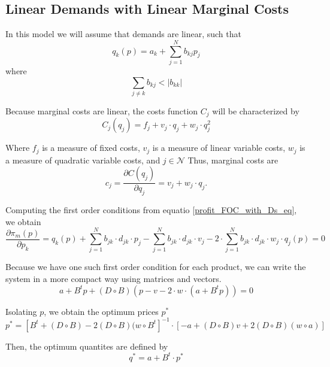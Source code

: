 \documentclass[12pt]{article}
\begin{document}
\subsection{Linear Demands with Linear Marginal Costs}

In this model we will assume that demands are linear, such that
\begin{equation*}
q_k(p) = a_k + \sum_{j=1}^N b_{kj}p_j
\end{equation*}
where
\begin{equation*}
\sum_{j \neq k} b_{kj} < |b_{kk}|
\end{equation*}

Because marginal costs are linear, the costs function $C_j$ will be characterized by
\begin{equation*}
C_j(q_j) = f_j + v_j \cdot q_j + w_j \cdot q_j^2
\end{equation*}

Where $f_j$ is a measure of fixed costs, $v_j$ is a measure of linear variable costs, $w_j$ is a measure of quadratic variable costs, and $j \in \mathcal{N}$ Thus, marginal costs are
\begin{equation*}
c_j = \frac{\partial C(q_j)}{\partial q_j}= v_j + w_j \cdot q_j.
\end{equation*}

Computing the first order conditions from equatio \ref{profit_FOC_with_Ds_eq}, we obtain
\begin{equation*}
\frac{\partial\pi_m(p)}{\partial p_k} = q_k(p) + \sum_{j = 1}^N b_{jk} \cdot d_{jk} \cdot p_j - \sum_{j = 1}^N b_{jk} \cdot d_{jk} \cdot v_j - 2 \cdot \sum_{j = 1}^N b_{jk} \cdot d_{jk} \cdot w_j \cdot q_j (p) = 0
\end{equation*}

Because we have one such first order condition for each product, we can write the system in a more compact way using matrices and vectors. 
\begin{equation*}
a + B ^ t p + (D \circ B)(p - v - 2 \cdot w \cdot (a + B^t p)) = 0
\end{equation*}

Isolating $p$, we obtain the optimum prices $p^*$
\begin{equation*}
p^* = [B^t + (D \circ B) - 2 (D \circ B)(w \circ B^t]^{-1} \cdot [-a + (D \circ B) v + 2 (D \circ B)(w \circ a)]
\end{equation*}

Then, the optimum quantites are defined by
\begin{equation*}
q^* = a + B^t \cdot p^*
\end{equation*}
\end{document}
